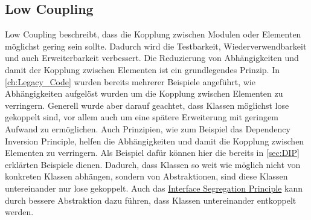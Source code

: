 \subsection{Low Coupling}
\label{sec:Low_Coupling}
Low Coupling beschreibt, dass die Kopplung zwischen Modulen oder Elementen möglichst gering sein sollte.
Dadurch wird die Testbarkeit, Wiederverwendbarkeit und auch Erweiterbarkeit verbessert.
Die Reduzierung von Abhängigkeiten und damit der Kopplung zwischen Elementen ist ein grundlegendes Prinzip.
In \ref{ch:Legacy_Code} wurden bereits mehrerer Beispiele angeführt, wie Abhängigkeiten aufgelöst wurden um die Kopplung zwischen Elementen zu verringern.
Generell wurde aber darauf geachtet, dass Klassen möglichst lose gekoppelt sind, vor allem auch um eine spätere Erweiterung mit geringem Aufwand zu ermöglichen.
Auch Prinzipien, wie zum Beispiel das Dependency Inversion Principle, helfen die Abhängigkeiten und damit die Kopplung zwischen Elementen zu verringern.
Als Beispiel dafür können hier die bereits in \ref{sec:DIP} erklärten Beispiele dienen.
Dadurch, dass Klassen so weit wie möglich nicht von konkreten Klassen abhängen, sondern von Abstraktionen, sind diese Klassen untereinander nur lose gekoppelt.
Auch das \hyperref[sec:ISP]{Interface Segregation Principle} kann durch bessere Abstraktion dazu führen, dass Klassen untereinander entkoppelt werden.
